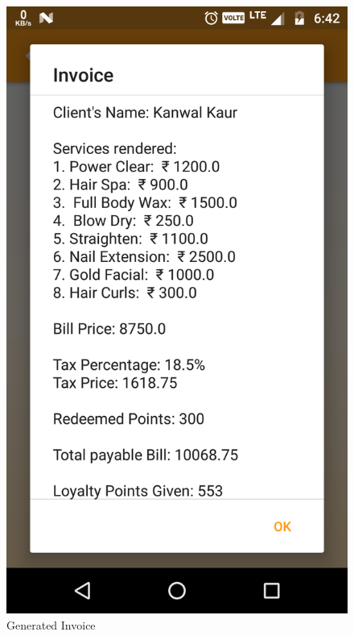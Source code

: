 \\
\begin{figure}[h]
	\centering
	\includegraphics[width=0.7\linewidth]{GeneratedInvoice}
	\caption{Generated Invoice}
\end{figure}
\pagebreak

\pagebreak
